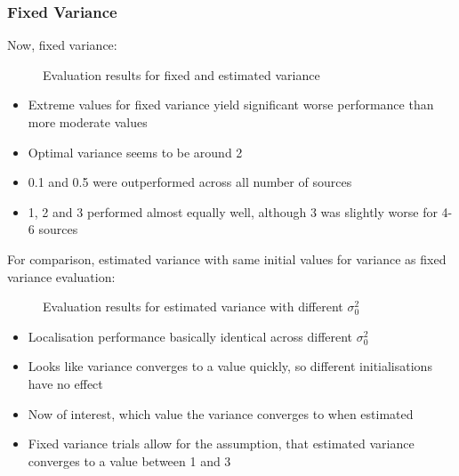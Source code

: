 \subsubsection{Fixed Variance}

Now, fixed variance:

\begin{figure}[H]
    \setlength\figureheight{7cm}
    \small
    \setlength\figurewidth{\textwidth}
	\centering
	\begin{tikzpicture}
	    \footnotesize
	    
	    
	\end{tikzpicture}
	
	\caption{Evaluation results for fixed and estimated variance}
	\label{fig:boxplotVariance}
\end{figure}

\begin{itemize}
    \item Extreme values for fixed variance yield significant worse performance than more moderate values
    \item Optimal variance seems to be around 2
    \item 0.1 and 0.5 were outperformed across all number of sources
    \item 1, 2 and 3 performed almost equally well, although 3 was slightly worse for 4-6 sources
\end{itemize}

For comparison, estimated variance with same initial values for variance as fixed variance evaluation:
\begin{figure}[H]
    \setlength\figureheight{7cm}
    \small
    \setlength\figurewidth{\textwidth}
	\centering
	\begin{tikzpicture}
	    \footnotesize
	    
	    
	    
	\end{tikzpicture}
	
	\caption{Evaluation results for estimated variance with different $\sigma^2_0$}
	\label{fig:boxplotVariance}
\end{figure}

\begin{itemize}
    \item Localisation performance basically identical across different $\sigma^2_0$
    \item Looks like variance converges to a value quickly, so different initialisations have no effect
    \item Now of interest, which value the variance converges to when estimated
    \item Fixed variance trials allow for the assumption, that estimated variance converges to a value between 1 and 3
\end{itemize}
